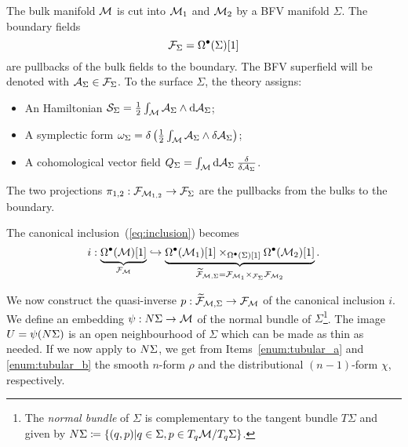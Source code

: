 The bulk manifold $\mathcal{M}$ is cut into $\mathcal{M}_1$ and $\mathcal{M}_2$ by a BFV manifold $\Sigma$.
The boundary fields
\begin{equation*}
    \mathcal{F}_\Sigma = \Omega^\bullet (\Sigma)[1]
\end{equation*}
are pullbacks of the bulk fields to the boundary. The BFV superfield will be denoted with $\mathcal{A}_\Sigma \in \mathcal{F}_\Sigma$.
To the surface $\Sigma$, the theory assigns:
\begin{itemize} %
    \item An Hamiltonian $\mathcal{S}_\Sigma = \frac{1}{2}\int_{\mathcal{M}} \mathcal{A}_\Sigma \wedge \dd \mathcal{A}_\Sigma$;
    \item A symplectic form $\omega_\Sigma = \delta \left( \frac{1}{2} \int_{\mathcal{M}} \mathcal{A}_\Sigma \wedge \delta \mathcal{A}_\Sigma \right)$;
    \item A cohomological vector field $Q_\Sigma = \int_{\mathcal{M}} \dd \mathcal{A}_\Sigma \: \frac{\delta}{\delta \mathcal{A}_\Sigma}$.
\end{itemize}

The two projections $\pi_{1,2} : \mathcal{F}_{\mathcal{M}_{1,2}} \rightarrow \mathcal{F}_\Sigma$ are the pullbacks from the bulks to the boundary.

The canonical inclusion~(\ref{eq:inclusion}) becomes
\begin{equation*}
    i : \underbrace{\Omega^\bullet (\mathcal{M})[1]}_{\mathcal{F}_{\mathcal{M}}} \hookrightarrow 
    \underbrace{\Omega^\bullet (\mathcal{M}_1)[1] \times_{\Omega^\bullet (\Sigma)[1]} \Omega^\bullet (\mathcal{M}_2)[1]}_{\widetilde{\mathcal{F}}_{\mathcal{M}, \Sigma} = \mathcal{F}_{\mathcal{M}_1} \times_{\mathcal{F}_\Sigma} \mathcal{F}_{\mathcal{M}_2}} .
\end{equation*}

We now construct the quasi-inverse $p: \widetilde{\mathcal{F}}_{\mathcal{M}, \Sigma} \rightarrow \mathcal{F}_{\mathcal{M}}$ of the canonical inclusion $i$.
We define an embedding $\psi: N \Sigma \rightarrow \mathcal{M}$ of the normal bundle of $\Sigma$\footnote{The \emph{normal bundle} of $\Sigma$ is complementary to the tangent bundle $T\Sigma$ and given by 
$N\Sigma \coloneqq \{ (q, p) | q \in \Sigma, p \in T_q \mathcal{M} / T_q \Sigma \}$.}.
The image $U = \psi(N \Sigma)$ is an open neighbourhood of $\Sigma$ which can be made as thin as needed.
If we now apply  to $N \Sigma$, we get from Items~\ref{enum:tubular_a} and \ref{enum:tubular_b} the smooth $n$-form $\rho$ and the distributional $(n-1)$-form $\chi$, respectively.

